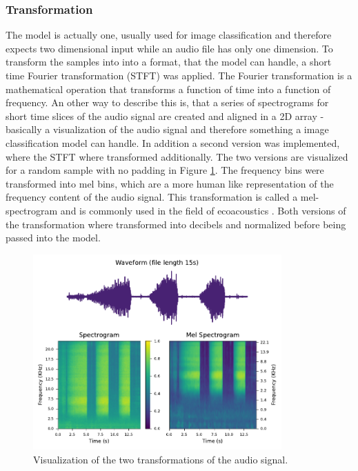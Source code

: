 \subsubsection{Transformation}
The model is actually one, usually used for image classification and therefore expects
two dimensional input while an audio file has only one dimension. To transform the samples into
into a format, that the model can handle, a short time Fourier transformation  (STFT) was applied.
The Fourier transformation is a mathematical operation that transforms a function of time
into a function of frequency. An other way to describe this is, that a series of spectrograms
for short time slices of the audio signal are created and aligned in a 2D array - basically
a visualization of the audio signal and therefore something a image classification model can handle.
In addition a second version was implemented, where the STFT where transformed additionally.
The two versions are visualized for a random sample with no padding in Figure \ref{fig:transformations}.
The frequency bins were transformed into mel bins, which are a more human like representation
of the frequency content of the audio signal. This transformation is called a mel-spectrogram
and is commonly used in the field of ecoacoustics \autocite[7]{stowellComputationalBioacousticsDeep2022}.
Both versions of the transformation where transformed into decibels and normalized before 
being passed into the model.

\begin{figure}[h]
    \centering
    \captionsetup{width=.7\linewidth}
    \includegraphics[width=0.85\textwidth]{figures/compare_spectrogram.pdf}
    \caption{Visualization of the two transformations of the audio signal.}
    \label{fig:transformations}
\end{figure}

